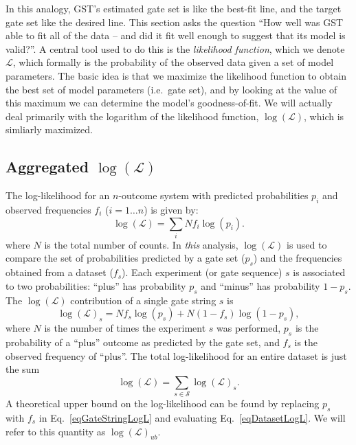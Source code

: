 \documentclass{article}[11pt]
\begin{document}
In this analogy, GST's estimated gate set is like the best-fit line, and the target gate set like the desired line.  This section asks the question ``How well was GST able to fit all of the data -- and did it fit well enough to suggest that its model is valid?''. A central tool used to do this is the \emph{likelihood function}, which we denote $\mathcal{L}$, which formally is the probability of the observed data given a set of model parameters.  The basic idea is that we maximize the likelihood function to obtain the best set of model parameters (i.e.~gate set), and by looking at the value of this maximum we can determine the model's goodness-of-fit.  We will actually deal primarily with the logarithm of the likelihood function, $\log(\mathcal{L})$, which is simliarly maximized.

\subsection{Aggregated $\log(\mathcal{L})$}

The log-likelihood for an $n$-outcome system with predicted probabilities $p_i$ and observed frequencies $f_i$ ($i=1\ldots n$) is given by:
\begin{equation}
\log(\mathcal{L}) = \sum_i N f_i \log(p_i).
\end{equation}
where $N$ is the total number of counts. In \emph{this} analysis, $\log(\mathcal{L})$ is used to compare the set of probabilities predicted by a gate set ($p_s$) and the frequencies obtained from a dataset ($f_s$).  Each experiment (or gate sequence) $s$ is associated to two probabilities:  ``plus'' has probability $p_s$ and ``minus'' has probability $1-p_s$.  The $\log(\mathcal{L})$ contribution of a single gate string $s$ is
\begin{equation}
\log(\mathcal{L})_s = N f_s \log(p_s) + N (1-f_s) \log(1-p_s),\label{eqGateStringLogL}
\end{equation}
where $N$ is the number of times the experiment $s$ was performed, $p_s$ is the probability of a ``plus'' outcome as predicted by the gate set, and $f_s$ is the observed frequency of ``plus''.  The total log-likelihood for an entire dataset is just the sum 
\begin{equation}
\log(\mathcal{L}) = \sum_{s\in\mathcal{S}}{ \log(\mathcal{L})_s}.\label{eqDatasetLogL}
\end{equation}
A theoretical upper bound on the log-likelihood can be found by replacing $p_s$ with $f_s$ in Eq.~\ref{eqGateStringLogL} and evaluating Eq.~\ref{eqDatasetLogL}.  We will refer to this quantity as $\log(\mathcal{L})_{ub}$.
\end{document}
